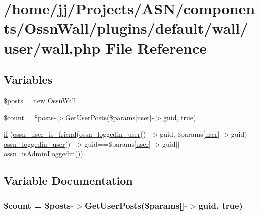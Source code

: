 \hypertarget{wall_2user_2wall_8php}{}\section{/home/jj/\+Projects/\+A\+S\+N/components/\+Ossn\+Wall/plugins/default/wall/user/wall.php File Reference}
\label{wall_2user_2wall_8php}
\subsection*{Variables}
\begin{DoxyCompactItemize}
\item 
\hyperlink{wall_2user_2wall_8php_a9f4cad5a721e7f7711fba0bf0f7ec273}{\$posts} = new \hyperlink{class_ossn_wall}{Ossn\+Wall}
\item 
\hyperlink{wall_2user_2wall_8php_af789423037bbc89dc7c850e761177570}{\$count} = \$posts-\/$>$Get\+User\+Posts(\$params\mbox{[}\textquotesingle{}\hyperlink{ossn_8config_8db_8example_8php_a802544b7ba9f79bbf24ef67773d53bed}{user}\textquotesingle{}\mbox{]}-\/$>$guid, true)
\item 
\hyperlink{wall_2user_2wall_8php_ac93ec01c6c1a973ed7349172ed00521f}{if} (\hyperlink{ossn_8lib_8users_8php_a3ac6849a8163e7fade08e00fd5cc6bb6}{ossn\+\_\+user\+\_\+is\+\_\+friend}(\hyperlink{ossn_8lib_8users_8php_aa3c8068d0e6638b414d6a2f6c62565b8}{ossn\+\_\+loggedin\+\_\+user}() -\/$>$guid, \$params\mbox{[}\textquotesingle{}\hyperlink{ossn_8config_8db_8example_8php_a802544b7ba9f79bbf24ef67773d53bed}{user}\textquotesingle{}\mbox{]}-\/$>$guid)$\vert$$\vert$\hyperlink{ossn_8lib_8users_8php_aa3c8068d0e6638b414d6a2f6c62565b8}{ossn\+\_\+loggedin\+\_\+user}() -\/$>$guid==\$params\mbox{[}\textquotesingle{}\hyperlink{ossn_8config_8db_8example_8php_a802544b7ba9f79bbf24ef67773d53bed}{user}\textquotesingle{}\mbox{]}-\/$>$guid$\vert$$\vert$\hyperlink{ossn_8lib_8users_8php_abf45a4c659ffd196160e8173c2af1106}{ossn\+\_\+is\+Admin\+Loggedin}())
\end{DoxyCompactItemize}


\subsection{Variable Documentation}
\subsubsection[{\texorpdfstring{\$count}{$count}}]{\setlength{\rightskip}{0pt plus 5cm}\${\bf count} = \$posts-\/$>$Get\+User\+Posts(\$params\mbox{[}\textquotesingle{}\mbox{]}-\/$>$guid, true)}\hypertarget{wall_2user_2wall_8php_af789423037bbc89dc7c850e761177570}{}\label{wall_2user_2wall_8php_af789423037bbc89dc7c850e761177570}


